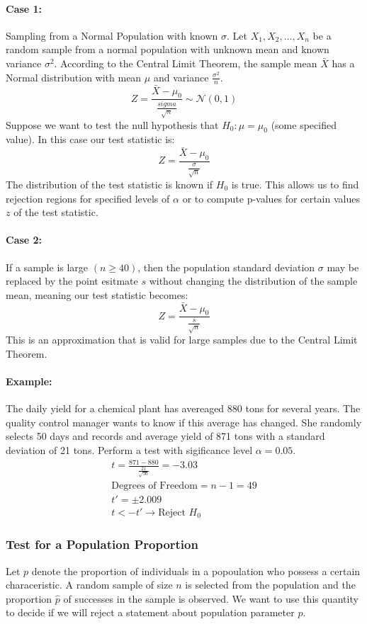 \paragraph*{Case 1:} Sampling from a Normal Population with known $\sigma$. Let $X_1, X_2, \ldots, X_n$ be a random sample from a normal population with
unknown mean and known variance $\sigma^2$. According to the Central Limit Theorem, 
the sample mean $\bar{X}$ has a Normal distribution with mean $\mu$ and variance $\frac{\sigma^2}{n}$.
\[
    Z = \frac{\bar{X}-\mu_0}{\frac{sigma}{\sqrt{n}}} \sim \mathcal{N}(0,1)
\]
Suppose we want to test the null hypothesis that $H_0 : \mu = \mu_0$ (some specified value). In this case our test statistic is:
\[
    Z = \frac{\bar{X}-\mu_0}{\frac{\sigma}{\sqrt{n}}}
\]
The distribution of the test statistic is known if $H_0$ is true. This allows us to find rejection
regions for specified levels of $\alpha$ or to compute p-values for certain values $z$ of 
the test statistic.

\paragraph*{Case 2:} 
If a sample is large $(n \geq 40)$, then the population standard deviation $\sigma$ may be replaced by the point esitmate $s$ 
without changing the distribution of the sample mean, meaning our test statistic becomes:
\[
    Z = \frac{\bar{X}-\mu_0}{\frac{s}{\sqrt{n}}}
\]
This is an approximation that is valid for large samples due to the Central Limit Theorem.

\paragraph*{Example:} 
The daily yield for a chemical plant has avereaged 880 tons for several years. The quality control manager
wants to know if this average has changed. She randomly selects 50 days and records and average yield of
871 tons with a standard deviation of 21 tons. Perform a test with sigificance level $\alpha = 0.05$.
\begin{align*}
    t = \frac{871 - 880}{\frac{21}{\sqrt{50}}} = -3.03\\
    \text{Degrees of Freedom} = n - 1 = 49\\
    t' = \pm 2.009\\
    t < -t' \rightarrow \text{Reject } H_0
\end{align*}

\subsubsection*{Test for a Population Proportion}
Let $p$ denote the proportion of individuals in a popoulation who possess a certain characeristic.
A random sample of size $n$ is selected from the population and the proportion $\hat{p}$ of successes
in the sample is observed. We want to use this quantity to decide if we will reject a statement about
population parameter $p$.

